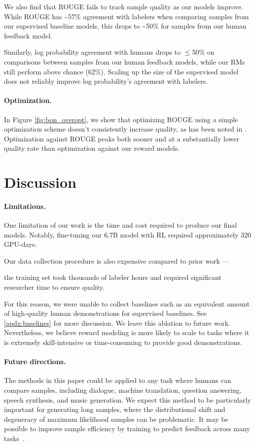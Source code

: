 We also find that ROUGE fails to track sample quality as our models improve. While ROUGE has \textasciitilde57\% agreement with labelers when comparing samples from our supervised baseline models, this drops to \textasciitilde50\% for samples from our human feedback model. 

Similarly, log probability agreement with humans drops to $\leq$50\% on comparisons between samples from our human feedback models, while our RMs still perform above chance (62\%). Scaling up the size of the supervised model does not reliably improve log probability's agreement with labelers.

\paragraph{Optimization.}

In Figure \ref{fig:bon_overopt}, we show that optimizing ROUGE using a simple optimization scheme doesn't consistently increase quality, as has been noted in \cite{paulus2017deep}.  Optimization against ROUGE peaks both sooner and at a substantially lower quality rate than optimization against our reward models.

\section{Discussion}

\paragraph{Limitations.}
One limitation of our work is the time and cost required to produce our final models. Notably, fine-tuning our 6.7B model with RL required approximately 320 GPU-days.

Our data collection procedure is also expensive compared to prior work --- 

the training set took thousands of labeler hours and required significant researcher time to ensure quality. 

For this reason, we were unable to collect baselines such as an equivalent amount of high-quality human demonstrations for supervised baselines. See \ref{apdx:baselines} for more discussion.  We leave this ablation to future work. Nevertheless, we believe reward modeling is more likely to scale to tasks where it is extremely skill-intensive or time-consuming to provide good demonstrations.  

\paragraph{Future directions.} The methods in this paper could be applied to any task where humans can compare samples, including dialogue, machine translation, question answering, speech synthesis, and music generation. We expect this method to be particularly important for generating long samples, where the distributional shift and degeneracy of maximum likelihood samples can be problematic. It may be possible to improve sample efficiency by training to predict feedback across many tasks~\cite{mccann2018natural}.


